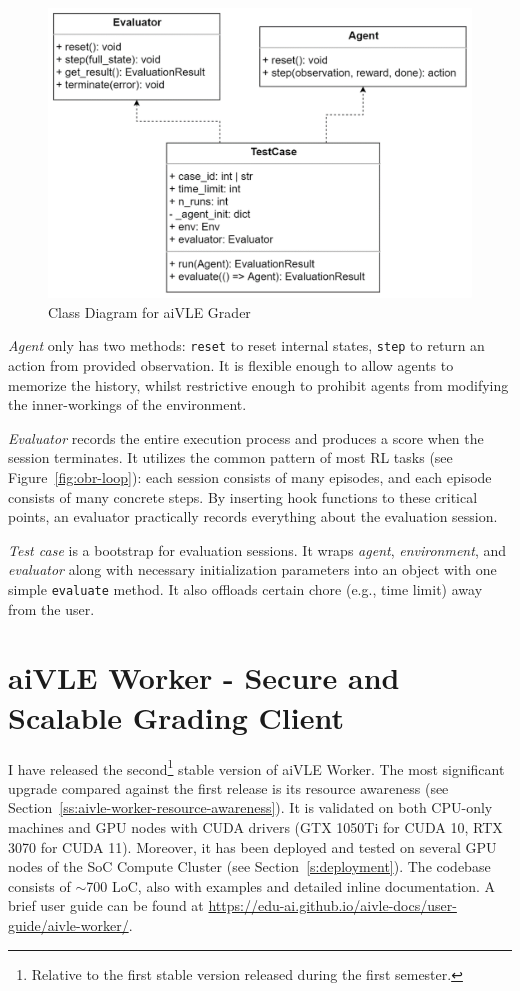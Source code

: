 \begin{figure}[H]
    \centering
    \includegraphics{images/aivle-grader-class.png}
    \caption{Class Diagram for aiVLE Grader}
    \label{fig:aivle-grader-class}
\end{figure}

\textit{Agent} only has two methods: \texttt{reset} to reset internal states, \texttt{step} to return an action from provided observation. It is flexible enough to allow agents to memorize the history, whilst restrictive enough to prohibit agents from modifying the inner-workings of the environment.

\textit{Evaluator} records the entire execution process and produces a score when the session terminates. It utilizes the common pattern of most RL tasks (see Figure~\ref{fig:obr-loop}): each session consists of many episodes, and each episode consists of many concrete steps. By inserting hook functions to these critical points, an evaluator practically records everything about the evaluation session. 

\textit{Test case} is a bootstrap for evaluation sessions. It wraps \textit{agent}, \textit{environment}, and \textit{evaluator} along with necessary initialization parameters into an object with one simple \texttt{evaluate} method. It also offloads certain chore (e.g., time limit) away from the user.

\section{aiVLE Worker - Secure and Scalable Grading Client}
\label{ch:aivle-worker}
I have released the second\footnote{Relative to the first stable version released during the first semester.} stable version of aiVLE Worker. The most significant upgrade compared against the first release is its resource awareness (see Section~\ref{ss:aivle-worker-resource-awareness}). It is validated on both CPU-only machines and GPU nodes with CUDA drivers (GTX 1050Ti for CUDA 10, RTX 3070 for CUDA 11). Moreover, it has been deployed and tested on several GPU nodes of the SoC Compute Cluster (see Section~\ref{s:deployment}). The codebase consists of $\sim$700 LoC, also with examples and detailed inline documentation. A brief user guide can be found at \href{https://edu-ai.github.io/aivle-docs/user-guide/aivle-worker/}{https://edu-ai.github.io/aivle-docs/user-guide/aivle-worker/}.

